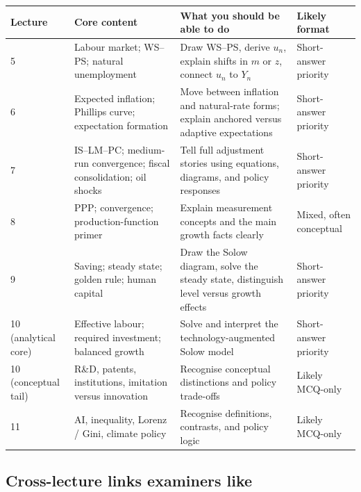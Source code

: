 \documentclass[12pt]{article}
\begin{document}
\begin{center}
\renewcommand{\arraystretch}{1.25}
\begin{tabular}{|p{2.0cm}|p{5.3cm}|p{5.1cm}|p{2.8cm}|}
\hline
\textbf{Lecture} & \textbf{Core content} & \textbf{What you should be able to do} & \textbf{Likely format} \\
\hline
5 & Labour market; WS--PS; natural unemployment & Draw WS--PS, derive \(u_n\), explain shifts in \(m\) or \(z\), connect \(u_n\) to \(Y_n\) & Short-answer priority \\
\hline
6 & Expected inflation; Phillips curve; expectation formation & Move between inflation and natural-rate forms; explain anchored versus adaptive expectations & Short-answer priority \\
\hline
7 & IS--LM--PC; medium-run convergence; fiscal consolidation; oil shocks & Tell full adjustment stories using equations, diagrams, and policy responses & Short-answer priority \\
\hline
8 & PPP; convergence; production-function primer & Explain measurement concepts and the main growth facts clearly & Mixed, often conceptual \\
\hline
9 & Saving; steady state; golden rule; human capital & Draw the Solow diagram, solve the steady state, distinguish level versus growth effects & Short-answer priority \\
\hline
10 (analytical core) & Effective labour; required investment; balanced growth & Solve and interpret the technology-augmented Solow model & Short-answer priority \\
\hline
10 (conceptual tail) & R\&D, patents, institutions, imitation versus innovation & Recognise conceptual distinctions and policy trade-offs & Likely MCQ-only \\
\hline
11 & AI, inequality, Lorenz / Gini, climate policy & Recognise definitions, contrasts, and policy logic & Likely MCQ-only \\
\hline
\end{tabular}
\end{center}

\subsection{Cross-lecture links examiners like}
\end{document}
